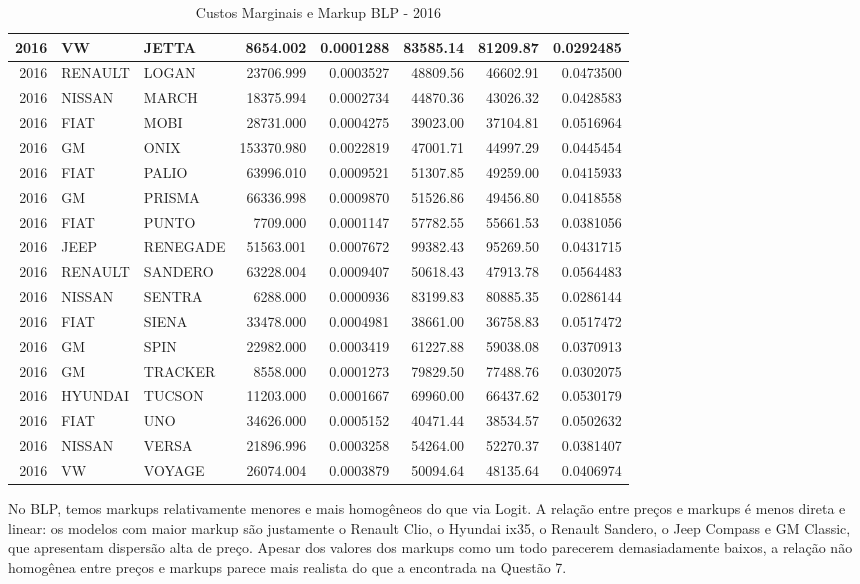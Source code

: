 \documentclass{article}
\begin{document}
\begin{table}[H]
\begin{tabular}{r|l|l|r|r|r|r|r}
\hline
2016 & VW & JETTA & 8654.002 & 0.0001288 & 83585.14 & 81209.87 & 0.0292485\\
\hline
2016 & RENAULT & LOGAN & 23706.999 & 0.0003527 & 48809.56 & 46602.91 & 0.0473500\\
\hline
2016 & NISSAN & MARCH & 18375.994 & 0.0002734 & 44870.36 & 43026.32 & 0.0428583\\
\hline
2016 & FIAT & MOBI & 28731.000 & 0.0004275 & 39023.00 & 37104.81 & 0.0516964\\
\hline
2016 & GM & ONIX & 153370.980 & 0.0022819 & 47001.71 & 44997.29 & 0.0445454\\
\hline
2016 & FIAT & PALIO & 63996.010 & 0.0009521 & 51307.85 & 49259.00 & 0.0415933\\
\hline
2016 & GM & PRISMA & 66336.998 & 0.0009870 & 51526.86 & 49456.80 & 0.0418558\\
\hline
2016 & FIAT & PUNTO & 7709.000 & 0.0001147 & 57782.55 & 55661.53 & 0.0381056\\
\hline
2016 & JEEP & RENEGADE & 51563.001 & 0.0007672 & 99382.43 & 95269.50 & 0.0431715\\
\hline
2016 & RENAULT & SANDERO & 63228.004 & 0.0009407 & 50618.43 & 47913.78 & 0.0564483\\
\hline
2016 & NISSAN & SENTRA & 6288.000 & 0.0000936 & 83199.83 & 80885.35 & 0.0286144\\
\hline
2016 & FIAT & SIENA & 33478.000 & 0.0004981 & 38661.00 & 36758.83 & 0.0517472\\
\hline
2016 & GM & SPIN & 22982.000 & 0.0003419 & 61227.88 & 59038.08 & 0.0370913\\
\hline
2016 & GM & TRACKER & 8558.000 & 0.0001273 & 79829.50 & 77488.76 & 0.0302075\\
\hline
2016 & HYUNDAI & TUCSON & 11203.000 & 0.0001667 & 69960.00 & 66437.62 & 0.0530179\\
\hline
2016 & FIAT & UNO & 34626.000 & 0.0005152 & 40471.44 & 38534.57 & 0.0502632\\
\hline
2016 & NISSAN & VERSA & 21896.996 & 0.0003258 & 54264.00 & 52270.37 & 0.0381407\\
\hline
2016 & VW & VOYAGE & 26074.004 & 0.0003879 & 50094.64 & 48135.64 & 0.0406974\\
\hline
\end{tabular}
    \caption{Custos Marginais e Markup BLP - 2016}
    \label{tab:custoblp}
\end{table}

No BLP, temos markups relativamente menores e mais homogêneos do que via Logit. A relação entre preços e markups é menos direta e linear: os modelos com maior markup são justamente o Renault Clio, o Hyundai ix35, o Renault Sandero, o Jeep Compass e GM Classic, que apresentam dispersão alta de preço. Apesar dos valores dos markups como um todo parecerem demasiadamente baixos, a relação não homogênea entre preços e markups parece mais realista do que a encontrada na Questão 7.




\end{document}
